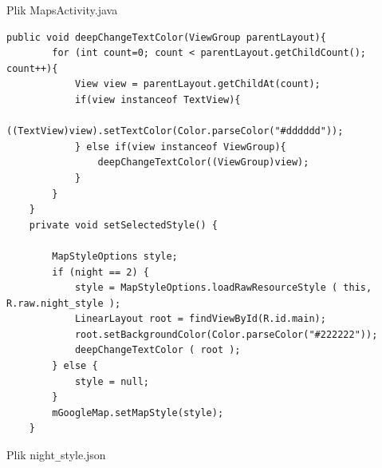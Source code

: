 \documentclass[a4paper]{article}
\begin{document}
Plik MapsActivity.java
\begin{lstlisting}[style=java]
public void deepChangeTextColor(ViewGroup parentLayout){
        for (int count=0; count < parentLayout.getChildCount(); count++){
            View view = parentLayout.getChildAt(count);
            if(view instanceof TextView){
                ((TextView)view).setTextColor(Color.parseColor("#dddddd"));
            } else if(view instanceof ViewGroup){
                deepChangeTextColor((ViewGroup)view);
            }
        }
    }
    private void setSelectedStyle() {

        MapStyleOptions style;
        if (night == 2) {
            style = MapStyleOptions.loadRawResourceStyle ( this, R.raw.night_style );
            LinearLayout root = findViewById(R.id.main);
            root.setBackgroundColor(Color.parseColor("#222222"));
            deepChangeTextColor ( root );
        } else {
            style = null;
        }
        mGoogleMap.setMapStyle(style);
    }
\end{lstlisting}
Plik night\verb|_|style.json
\end{document}
